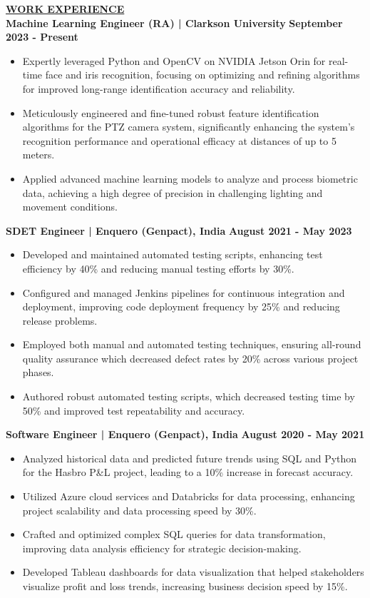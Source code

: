 \documentclass{article}
\begin{document}
\noindent \textbf{\underline{WORK EXPERIENCE}}\\
\noindent \textbf{Machine Learning Engineer (RA) | Clarkson University} \hfill \textbf{September 2023 - Present}
\begin{itemize}[noitemsep,nolistsep,leftmargin=*]
\item {\small Expertly leveraged Python and OpenCV on NVIDIA Jetson Orin for real-time face and iris recognition, focusing on optimizing and refining algorithms for improved long-range identification accuracy and reliability.}
\item {\small Meticulously engineered and fine-tuned robust feature identification algorithms for the PTZ camera system, significantly enhancing the system's recognition performance and operational efficacy at distances of up to 5 meters.}
\item {\small Applied advanced machine learning models to analyze and process biometric data, achieving a high degree of precision in challenging lighting and movement conditions.}
\end{itemize}
\noindent \textbf{SDET Engineer | Enquero (Genpact), India} \hfill \textbf{August 2021 - May 2023}
\begin{itemize}[noitemsep,nolistsep,leftmargin=*]
\item {\small Developed and maintained automated testing scripts, enhancing test efficiency by 40\% and reducing manual testing efforts by 30\%.}
\item {\small Configured and managed Jenkins pipelines for continuous integration and deployment, improving code deployment frequency by 25\% and reducing release problems.}
\item {\small Employed both manual and automated testing techniques, ensuring all-round quality assurance which decreased defect rates by 20\% across various project phases.}
\item {\small Authored robust automated testing scripts, which decreased testing time by 50\% and improved test repeatability and accuracy.}
\end{itemize}
\noindent \textbf{Software Engineer | Enquero (Genpact), India} \hfill \textbf{August 2020 - May 2021}
\begin{itemize}[noitemsep,nolistsep,leftmargin=*]
\item {\small Analyzed historical data and predicted future trends using SQL and Python for the Hasbro P\&L project, leading to a 10\% increase in forecast accuracy.}
\item {\small Utilized Azure cloud services and Databricks for data processing, enhancing project scalability and data processing speed by 30\%.}
\item {\small Crafted and optimized complex SQL queries for data transformation, improving data analysis efficiency for strategic decision-making.}
\item {\small Developed Tableau dashboards for data visualization that helped stakeholders visualize profit and loss trends, increasing business decision speed by 15\%.}
\end{itemize}
\end{document}
